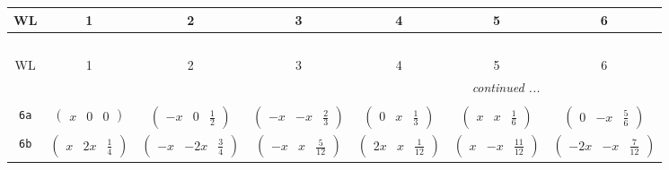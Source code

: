 \documentclass[fleqn,9pt,landscape]{jsarticle}
\begin{document}
\begin{center}
\renewcommand{\arraystretch}{1.2}
\begin{longtable}{ccccccc}
 \hline \hline
WL & 1 & 2 & 3 & 4 & 5 & 6 \\ \hline \endfirsthead

\multicolumn{6}{l}{\tablename\ \thetable{}} \\
 \hline \hline
WL & 1 & 2 & 3 & 4 & 5 & 6 \\ \hline \endhead

 \hline \hline
\multicolumn{6}{r}{\footnotesize\it continued ...} \\ \endfoot

 \hline \hline
\multicolumn{6}{r}{} \\ \endlastfoot

{\tt 6a} & $ \begin{pmatrix} x & 0 & 0 \end{pmatrix} $ & $ \begin{pmatrix} - x & 0 & \frac{1}{2} \end{pmatrix} $ & $ \begin{pmatrix} - x & - x & \frac{2}{3} \end{pmatrix} $ & $ \begin{pmatrix} 0 & x & \frac{1}{3} \end{pmatrix} $ & $ \begin{pmatrix} x & x & \frac{1}{6} \end{pmatrix} $ & $ \begin{pmatrix} 0 & - x & \frac{5}{6} \end{pmatrix} $ \\ \hline
{\tt 6b} & $ \begin{pmatrix} x & 2 x & \frac{1}{4} \end{pmatrix} $ & $ \begin{pmatrix} - x & - 2 x & \frac{3}{4} \end{pmatrix} $ & $ \begin{pmatrix} - x & x & \frac{5}{12} \end{pmatrix} $ & $ \begin{pmatrix} 2 x & x & \frac{1}{12} \end{pmatrix} $ & $ \begin{pmatrix} x & - x & \frac{11}{12} \end{pmatrix} $ & $ \begin{pmatrix} - 2 x & - x & \frac{7}{12} \end{pmatrix} $ \\ \hline

\end{longtable}
\end{center}
\end{document}
